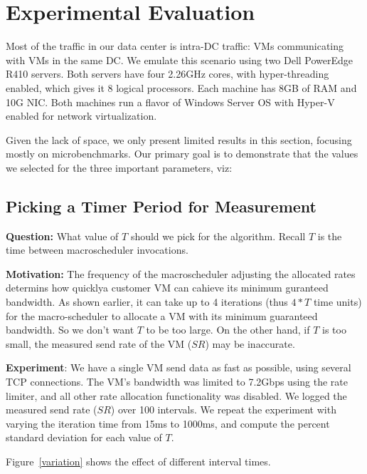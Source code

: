 \section{Experimental Evaluation}
\label{sec:experiments}

Most of the traffic in our data center is intra-DC traffic: VMs communicating
with VMs in the same DC. We emulate this scenario using two Dell PowerEdge R410
servers.  Both servers have four 2.26GHz cores, with hyper-threading enabled,
which gives it 8 logical processors.  Each machine has 8GB of RAM and 10G NIC.
Both machines run a flavor of Windows Server OS with Hyper-V enabled for network
virtualization. 

Given the lack of space, we only present limited results in this section,
focusing mostly on microbenchmarks. Our primary goal is to demonstrate that the
values we selected for the three important parameters, viz:

\subsection{Picking a Timer Period for Measurement}

{\bf Question:}  What value of $T$ should we pick for the algorithm. Recall $T$
is the time between macroscheduler invocations.

{\bf Motivation:}  The frequency of the macroscheduler adjusting the allocated
rates determins how quicklya  customer VM can cahieve its minimum guranteed
bandwidth.  As shown earlier, it can take up to 4 iterations (thus $4*T$ time
units) for the macro-scheduler to allocate a VM with its minimum guaranteed
bandwidth. So we don't want $T$ to be too large. On the other hand, if $T$ is
too small, the measured send rate of the VM ($SR$) may be inaccurate. 

{\bf Experiment}: We have a single VM send data as fast as possible, using
several TCP connections. The VM's bandwidth was limited to 7.2Gbps using the
rate limiter, and all other rate allocation functionality was disabled.  We
logged the measured send rate ($SR$) over 100 intervals.  We repeat the
experiment with varying the iteration time from 15ms to 1000ms, and compute the
percent standard deviation for each value of $T$. 

Figure~\ref{variation} shows the effect of different interval times.  

